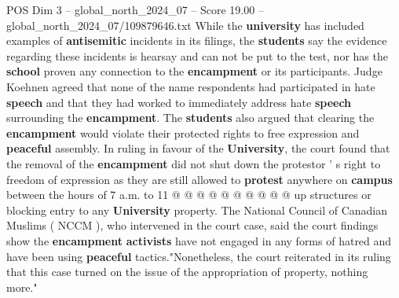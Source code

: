 \begin{textsample}{POS Dim 3 – global\_north\_2024\_07 – Score 19.00 – global\_north\_2024\_07/109879646.txt}
While the \textbf{university} has included examples of \textbf{antisemitic} incidents in its filings, the \textbf{students} say the evidence regarding these incidents is hearsay and can not be put to the test, nor has the \textbf{school} proven any connection to the \textbf{encampment} or its participants.
Judge Koehnen agreed that none of the name respondents had participated in hate \textbf{speech} and that they had worked to immediately address hate \textbf{speech} surrounding the \textbf{encampment}.
The \textbf{students} also argued that clearing the \textbf{encampment} would violate their protected rights to free expression and \textbf{peaceful} assembly.
In ruling in favour of the \textbf{University}, the court found that the removal of the \textbf{encampment} did not shut down the protestor ' s right to freedom of expression as they are still allowed to \textbf{protest} anywhere on \textbf{campus} between the hours of 7 a.m. to 11 @ @ @ @ @ @ @ @ @ @ up structures or blocking entry to any \textbf{University} property.
The National Council of Canadian Muslims ( NCCM ), who intervened in the court case, said the court findings show the \textbf{encampment} \textbf{activists} have not engaged in any forms of hatred and have been using \textbf{peaceful} tactics."Nonetheless, the court reiterated in its ruling that this case turned on the issue of the appropriation of property, nothing more."

\end{textsample}
